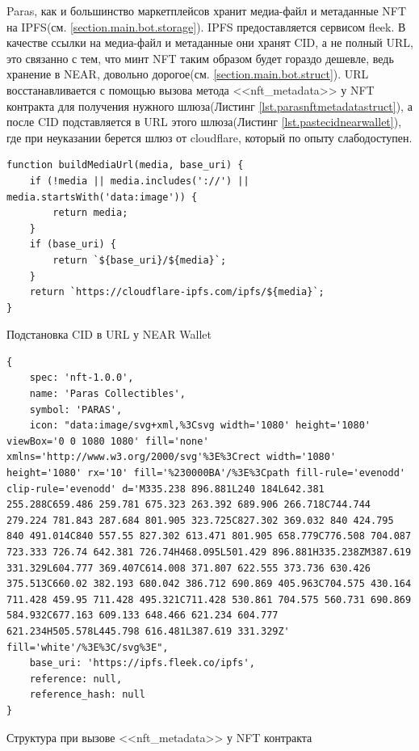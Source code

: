 Paras, как и большинство маркетплейсов хранит медиа-файл и метаданные NFT на IPFS\cite{ipfs}(см. {\color{blue} \ref{section.main.bot.storage}}). IPFS предоставляется сервисом fleek\cite{fleek}. В качестве ссылки на медиа-файл и метаданные они хранят CID, а не полный URL, это связанно с тем, что минт NFT таким образом будет гораздо дешевле, ведь хранение в NEAR, довольно дорогое(см. {\color{blue} \ref{section.main.bot.struct}}). URL восстанавливается с помощью вызова метода <<nft\_metadata>> у NFT контракта для получения нужного шлюза(Листинг {\color{blue}\ref{lst.parasnftmetadatastruct}}), а после CID подставляется в URL этого шлюза(Листинг {\color{blue}\ref{lst.pastecidnearwallet}}), где при неуказании берется шлюз от cloudflare, который по опыту слабодоступен.

\begin{listing}[H]
\begin{verbatim}
function buildMediaUrl(media, base_uri) {
    if (!media || media.includes('://') || media.startsWith('data:image')) {
        return media;
    }
    if (base_uri) {
        return `${base_uri}/${media}`;
    }
    return `https://cloudflare-ipfs.com/ipfs/${media}`;
}
\end{verbatim}
\caption{Подстановка CID в URL у NEAR Wallet\cite{pastecidnearwallet}}
\label{lst.pastecidnearwallet}
\end{listing}

\begin{listing}[H]
\begin{verbatim}
{
    spec: 'nft-1.0.0',
    name: 'Paras Collectibles',
    symbol: 'PARAS',
    icon: "data:image/svg+xml,%3Csvg width='1080' height='1080' viewBox='0 0 1080 1080' fill='none' xmlns='http://www.w3.org/2000/svg'%3E%3Crect width='1080' height='1080' rx='10' fill='%230000BA'/%3E%3Cpath fill-rule='evenodd' clip-rule='evenodd' d='M335.238 896.881L240 184L642.381 255.288C659.486 259.781 675.323 263.392 689.906 266.718C744.744 279.224 781.843 287.684 801.905 323.725C827.302 369.032 840 424.795 840 491.014C840 557.55 827.302 613.471 801.905 658.779C776.508 704.087 723.333 726.74 642.381 726.74H468.095L501.429 896.881H335.238ZM387.619 331.329L604.777 369.407C614.008 371.807 622.555 373.736 630.426 375.513C660.02 382.193 680.042 386.712 690.869 405.963C704.575 430.164 711.428 459.95 711.428 495.321C711.428 530.861 704.575 560.731 690.869 584.932C677.163 609.133 648.466 621.234 604.777 621.234H505.578L445.798 616.481L387.619 331.329Z' fill='white'/%3E%3C/svg%3E",
    base_uri: 'https://ipfs.fleek.co/ipfs',
    reference: null,
    reference_hash: null
}
\end{verbatim}
\caption{Структура при вызове <<nft\_metadata>> у NFT контракта}
\label{lst.parasfunctioncallnftmetadata}
\end{listing}

